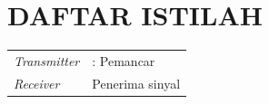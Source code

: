 \chapter*{DAFTAR ISTILAH}

\begin{center}
	\centering
	\begin{tabular}{p{2cm}p{12cm}}
		\textit{Transmitter} &: Pemancar \\
		\textit{Receiver} & Penerima sinyal\\
		
		
		
	\end{tabular}
\end{center}